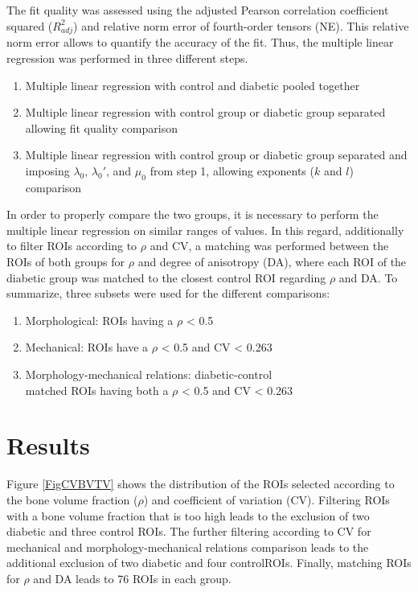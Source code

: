 \documentclass[a4paper,fleqn]{DC_ArtStyle}
\begin{document}
	The fit quality was assessed using the adjusted Pearson correlation coefficient squared ($R_{adj}^{2}$) and relative norm error of fourth-order tensors (NE).
	This relative norm error allows to quantify the accuracy of the fit.
	Thus, the multiple linear regression was performed in three different steps.
	\begin{enumerate}
		\item Multiple linear regression with control and diabetic pooled together
		\item Multiple linear regression with control group or diabetic group separated allowing fit quality comparison
		\item Multiple linear regression with control group or diabetic group separated and imposing $\lambda_0$, $\lambda_0'$, and $\mu_0$ from step 1, allowing exponents ($k$ and $l$) comparison
	\end{enumerate}
	In order to properly compare the two groups, it is necessary to perform the multiple linear regression on similar ranges of values.
	In this regard, additionally to filter ROIs according to $\rho$ and CV, a matching was performed between the ROIs of both groups for $\rho$ and degree of anisotropy (DA), where each ROI of the diabetic group was matched to the closest control ROI regarding $\rho$ and DA.
	To summarize, three subsets were used for the different comparisons:
	\begin{enumerate}
		\item Morphological: ROIs having a $\rho$ < 0.5
		\item Mechanical: ROIs have a $\rho$ < 0.5 and CV < 0.263
		\item Morphology-mechanical relations: diabetic-control\\matched ROIs having both a $\rho$ < 0.5 and CV < 0.263
	\end{enumerate}


	\section{Results}
	Figure \ref{FigCVBVTV} shows the distribution of the ROIs selected according to the bone volume fraction ($\rho$) and coefficient of variation (CV).
	Filtering ROIs with a bone volume fraction that is too high leads to the exclusion of two diabetic and three control ROIs.
	The further filtering according to CV for mechanical and morphology-mechanical relations comparison leads to the additional exclusion of two diabetic and four controlROIs.
	Finally, matching ROIs for $\rho$ and DA leads to 76 ROIs in each group.
   
\end{document}
